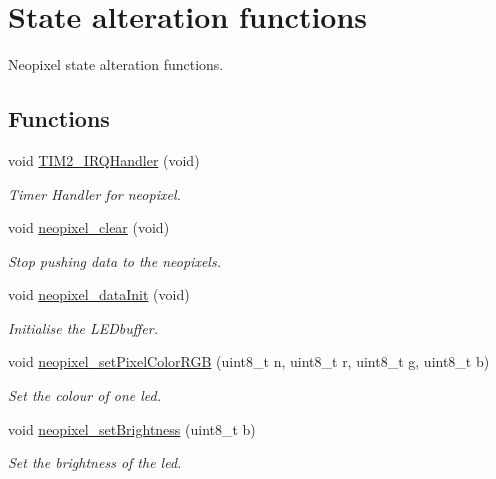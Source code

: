 \hypertarget{group___state}{}\section{State alteration functions}
\label{group___state}


Neopixel state alteration functions.  


\subsection*{Functions}
\begin{DoxyCompactItemize}
\item 
void \hyperlink{group___state_ga38ad4725462bdc5e86c4ead4f04b9fc2}{T\+I\+M2\+\_\+\+I\+R\+Q\+Handler} (void)
\begin{DoxyCompactList}\small\item\em Timer Handler for neopixel. \end{DoxyCompactList}\item 
void \hyperlink{group___state_ga8e3cfef785ce221672f825f8785c25b8}{neopixel\+\_\+clear} (void)
\begin{DoxyCompactList}\small\item\em Stop pushing data to the neopixels. \end{DoxyCompactList}\item 
void \hyperlink{group___state_ga79e34feddcfb2c45ae218166c84bdff4}{neopixel\+\_\+data\+Init} (void)
\begin{DoxyCompactList}\small\item\em Initialise the L\+E\+Dbuffer. \end{DoxyCompactList}\item 
void \hyperlink{group___state_gadbf8ae449ade0b6015cb75632182b04c}{neopixel\+\_\+set\+Pixel\+Color\+R\+GB} (uint8\+\_\+t n, uint8\+\_\+t r, uint8\+\_\+t g, uint8\+\_\+t b)
\begin{DoxyCompactList}\small\item\em Set the colour of one led. \end{DoxyCompactList}\item 
void \hyperlink{group___state_gae027558106eef5c81996294f4561fecb}{neopixel\+\_\+set\+Brightness} (uint8\+\_\+t b)
\begin{DoxyCompactList}\small\item\em Set the brightness of the led. \end{DoxyCompactList}\end{DoxyCompactItemize}


